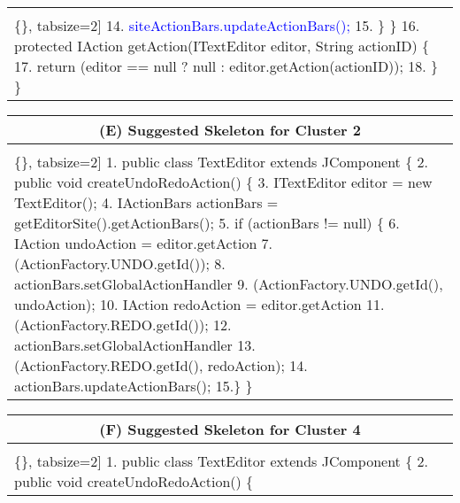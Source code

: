 \begin{figure*}[!htb]
\begin{minipage}{0.5\textwidth}
\begin{tabular}{@{}p{}}
\begin{Verbatim}[commandchars=\\\{\}, tabsize=2]
14.\textcolor{blue}{  siteActionBars.updateActionBars();    }         
15.  \} \}
16. protected IAction getAction(ITextEditor editor, String actionID) \{
17.   return (editor == null ? null : editor.getAction(actionID));
18.  \}  \}
 \end{Verbatim}
      \vspace{-4mm}
  \\      
\end{tabular} 
\end{minipage}
 \begin{minipage}{0.5\textwidth}
\scriptsize 
\begin{tabular}{@{}p{}} 
 \hline 
  \multicolumn{1}{c}{(E) Suggested Skeleton for Cluster 2} \\ \hline
  \vspace{-4mm}
\begin{Verbatim}[commandchars=\\\{\}, tabsize=2]
1. public class TextEditor extends JComponent \{
2.  public void createUndoRedoAction() \{
3.   ITextEditor editor = new TextEditor();
4.   IActionBars actionBars = getEditorSite().getActionBars();
5.      if (actionBars != null) \{     
6.        IAction undoAction = editor.getAction
7.          (ActionFactory.UNDO.getId());         
8.        actionBars.setGlobalActionHandler
9.          (ActionFactory.UNDO.getId(), undoAction);
10.       IAction redoAction = editor.getAction
11.         (ActionFactory.REDO.getId());
12.       actionBars.setGlobalActionHandler
13.          (ActionFactory.REDO.getId(), redoAction);
14.       actionBars.updateActionBars();
15.\} \}
 \end{Verbatim}
      \vspace{-4mm}
  \\     
\end{tabular} 
\end{minipage}
 \begin{minipage}{0.5\textwidth}
\scriptsize 
\begin{tabular}{@{}p{}} 
 \hline 
  \multicolumn{1}{c}{(F) Suggested Skeleton for Cluster 4} \\ \hline
  \vspace{-4mm}
\begin{Verbatim}[commandchars=\\\{\}, tabsize=2]
1. public class TextEditor extends JComponent \{
2.  public void createUndoRedoAction() \{
 

\end{Verbatim}
\end{tabular}
\end{minipage}
\end{figure*}
